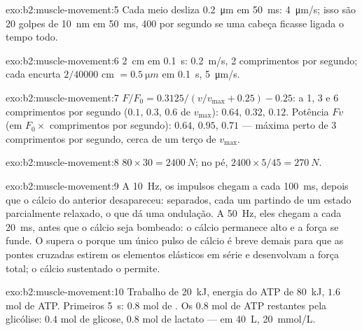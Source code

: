 \begin{solution}{exo:b2:muscle-movement:5}
Cada meio  desliza \qty{0.2}{\micro m} em \qty{50}{ms}:
\qty{4}{\micro m/s}; isso são 20 golpes de \qty{10}{nm} em
\qty{50}{ms}, 400 por segundo se uma cabeça ficasse ligada o tempo todo.
\end{solution}

\begin{solution}{exo:b2:muscle-movement:6}
\qty{2}{cm} em \qty{0.1}{s}: \qty{0.2}{m/s}, 2 comprimentos por segundo;
cada  encurta $2/\num{40000}$ cm $= \qty{0.5}{\micro m}$ em
\qty{0.1}{s}, \qty{5}{\micro m/s}.
\end{solution}

\begin{solution}{exo:b2:muscle-movement:7}
$F/F_0 = 0.3125/(v/v_{\max} + 0.25) - 0.25$: a 1, 3 e 6 comprimentos por
segundo ($0.1$, $0.3$, $0.6$ de $v_{\max}$): $0.64$, $0.32$, $0.12$.
Potência $Fv$ (em $F_0\times$ comprimentos por segundo): $0.64$, $0.95$,
$0.71$ --- máxima perto de 3 comprimentos por segundo, cerca de um terço
de $v_{\max}$.
\end{solution}

\begin{solution}{exo:b2:muscle-movement:8}
$80\times 30 = \qty{2400}{N}$; no pé, $2400\times 5/45 =
\qty{270}{N}$.
\end{solution}

\begin{solution}{exo:b2:muscle-movement:9}
A \qty{10}{Hz}, os impulsos chegam a cada \qty{100}{ms}, depois que o
cálcio do anterior desapareceu:  separados, cada um partindo de
um estado parcialmente relaxado, o que dá uma ondulação. A
\qty{50}{Hz}, eles chegam a cada \qty{20}{ms}, antes que o cálcio seja
bombeado: o cálcio permanece alto e a força se funde. O  supera o
 porque um único pulso de cálcio é breve demais para que as pontes
cruzadas estirem os elementos elásticos em série e desenvolvam a força
total; o cálcio sustentado o permite.
\end{solution}

\begin{solution}{exo:b2:muscle-movement:10}
Trabalho de \qty{20}{kJ}, energia do ATP de \qty{80}{kJ}, $1.6$ mol de
ATP. Primeiros \qty{5}{s}: $0.8$ mol de . Os $0.8$ mol de
ATP restantes pela glicólise: $0.4$ mol de glicose, $0.8$ mol de
lactato --- em \qty{40}{L}, \qty{20}{mmol/L}.
\end{solution}

